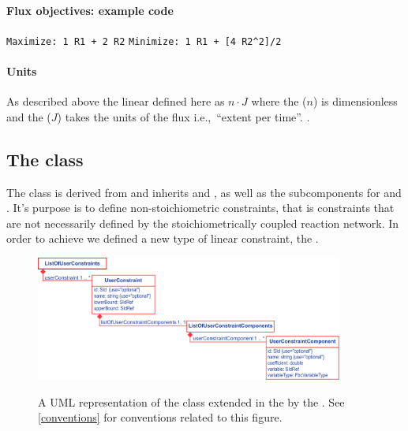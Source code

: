 \paragraph{Flux objectives: example code}
 \verb"Maximize: 1 R1 + 2 R2"
%
%
 \verb"Minimize: 1 R1 + [4 R2^2]/2"
%

\paragraph{Units}
As described above the linear \FluxObjective defined here as $n\cdot J$ where
the  ($n$) is dimensionless and the  ($J$)
takes the units of the  flux i.e.,~``extent per time''.
.



\subsection{The \FBC {} class}
\label{userconstraint-class}

The \FBC \UserConstraint class is derived from \SBML \SBase and inherits
 and , as well as the subcomponents for
\Annotation and \Notes. It's purpose is to define non-stoichiometric constraints, that is  constraints that are not necessarily defined by the stoichiometrically coupled reaction network. In order to achieve we defined a new type of linear constraint, the \UserConstraint.
%
\begin{figure}[ht]
  \centering
  \includegraphics[width=0.9\textwidth]{images/fbc_v3_uml_userconstraint.pdf}\\
  \caption{A UML representation of the \SBML \Model class extended in
  the \FBCPackage by the \ListOfUserConstraints. See \ref{conventions} for conventions related to this figure.}
  \label{fig:fbc_v3_uml_user_constraints}
\end{figure}


